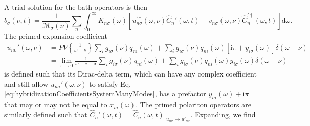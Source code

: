 A trial solution for the bath operators is then
\begin{equation}
\hat{b}_\sigma(\nu,t) = \frac{1}{\mathcal{M}_\sigma(\nu)}\sum_n\int_0^\infty K_{n\sigma}(\omega)\left[u_{n\sigma}^{\prime*}(\omega,\nu)\hat{C}_n'(\omega,t) - v_{n\sigma}(\omega,\nu)\hat{C}_n^{\prime\dagger}(\omega,t)\right]\mathrm{d}\omega.
\end{equation}
The primed expansion coefficient
\begin{equation}
\begin{split}
u_{n\sigma}'(\omega,\nu) &= PV\left\{\frac{1}{\omega - \nu }\right\}\sum_ig_{i\sigma}(\nu)q_{ni}(\omega) + \sum_ig_{i\sigma}(\nu)q_{ni}(\omega)[\mathrm{i}\pi + y_{i\sigma}(\omega)]\delta(\omega - \nu )\\
&= \lim_{\epsilon\to0}\frac{1}{\omega - \nu  - \mathrm{i}\epsilon}\sum_ig_{i\sigma}(\nu)q_{ni}(\omega) + \sum_ig_{i\sigma}(\nu)q_{ni}(\omega)y_{i\sigma}(\omega)\delta(\omega - \nu )
\end{split}
\end{equation}
is defined such that its Dirac-delta term, which can have any complex coefficient and still allow $u_{n\sigma}'(\omega,\nu)$ to satisfy Eq. \eqref{eq:hybridizationCoefficientsSystemManyModes}, has a prefactor $y_{i\sigma}(\omega) + \mathrm{i}\pi$ that may or may not be equal to $x_{i\sigma}(\omega)$. The primed polariton operators are similarly defined such that $\hat{C}_n'(\omega,t) = \hat{C}_n(\omega,t)|_{u_{n\sigma}\to u'_{n\sigma}}$. Expanding, we find
